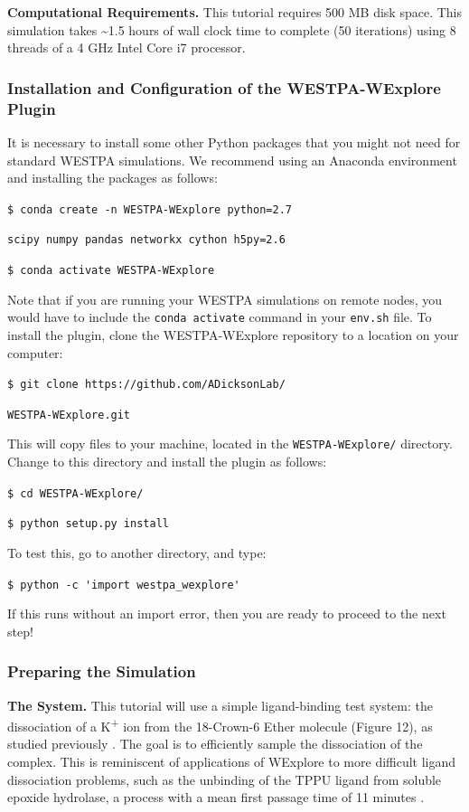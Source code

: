 \documentclass[9pt,tutorial]{livecoms}
\begin{document}
\textbf{Computational Requirements.} This tutorial requires 500 MB disk space. 
This simulation takes \textasciitilde 1.5 hours of wall clock time to complete (50 iterations) using 8 threads of a 4 GHz Intel Core i7 processor.  

\subsubsection{Installation and Configuration of the WESTPA-WExplore Plugin}

It is necessary to install some other Python packages that you might not need for standard WESTPA simulations. 
We recommend using an Anaconda environment and installing the packages as follows:

\verb|$ conda create -n WESTPA-WExplore python=2.7 |

\verb|scipy numpy pandas networkx cython h5py=2.6|

\verb|$ conda activate WESTPA-WExplore|

Note that if you are running your WESTPA simulations on remote nodes, you would have to include the \verb|conda activate| command in your \verb|env.sh| file. 
To install the plugin, clone the WESTPA-WExplore repository to a location on your computer:  

\verb|$ git clone https://github.com/ADicksonLab/|

\verb|WESTPA-WExplore.git|

This will copy files to your machine, located in the \verb|WESTPA-WExplore/| directory. 
Change to this directory and install the plugin as follows:

\verb|$ cd WESTPA-WExplore/|

\verb|$ python setup.py install|

To test this, go to another directory, and type:

\verb|$ python -c 'import westpa_wexplore'|

If this runs without an import error, then you are ready to proceed to the next step! 

\subsubsection{Preparing the Simulation}

\textbf{The System.} This tutorial will use a simple ligand-binding test system: the dissociation of a K\textsuperscript{+} ion from the 18-Crown-6 Ether molecule (Figure 12), as studied previously \citep{Zwier2011}. 
The goal is to efficiently sample the dissociation of the complex. 
This is reminiscent of applications of WExplore to more difficult ligand dissociation problems, such as the unbinding of the TPPU ligand from soluble epoxide hydrolase, a process with a mean first passage time of 11 minutes \citep{Lotz2018}.
\end{document}
